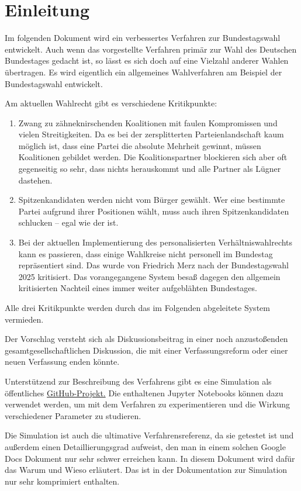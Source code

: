 \section{Einleitung}

Im folgenden Dokument wird ein verbessertes Verfahren zur Bundestagswahl entwickelt. Auch wenn
das vorgestellte Verfahren primär zur Wahl des Deutschen Bundestages gedacht ist, so lässt es
sich doch auf eine Vielzahl anderer Wahlen übertragen. Es wird eigentlich ein allgemeines
Wahlverfahren am Beispiel der Bundestagswahl entwickelt.

Am aktuellen Wahlrecht gibt es verschiedene Kritikpunkte:
\begin{enumerate}
  \item Zwang zu zähneknirschenden Koalitionen mit faulen Kompromissen und vielen Streitigkeiten.
    Da es bei der zersplitterten Parteienlandschaft kaum möglich ist, dass eine Partei die absolute
    Mehrheit gewinnt, müssen Koalitionen gebildet werden. Die Koalitionspartner blockieren sich
    aber oft gegenseitig so sehr, dass nichts herauskommt und alle Partner als Lügner dastehen.

  \item Spitzenkandidaten werden nicht vom Bürger gewählt. Wer eine bestimmte Partei aufgrund
    ihrer Positionen wählt, muss auch ihren Spitzenkandidaten schlucken -- egal wie der ist.

  \item Bei der aktuellen Implementierung des personalisierten Verhältniswahlrechts kann es
    passieren, dass einige Wahlkreise nicht personell im Bundestag repräsentiert sind. Das wurde
    von Friedrich Merz nach der Bundestagswahl 2025 kritisiert. Das vorangegangene System besaß
    dagegen den allgemein kritisierten Nachteil eines immer weiter aufgeblähten Bundestages.
\end{enumerate}

Alle drei Kritikpunkte werden durch das im Folgenden abgeleitete System vermieden.

Der Vorschlag versteht sich als Diskussionsbeitrag in einer noch anzustoßenden
gesamtgesellschaftlichen Diskussion, die mit einer Verfassungsreform oder einer neuen Verfassung
enden könnte.

Unterstützend zur Beschreibung des Verfahrens gibt es eine Simulation als öffentliches
\href{https://github.com/danielschwalbe/ipres}{GitHub-Projekt.} Die enthaltenen Jupyter Notebooks
können dazu verwendet werden, um mit dem Verfahren zu experimentieren und die Wirkung
verschiedener Parameter zu studieren.

Die Simulation ist auch die ultimative Verfahrensreferenz, da sie getestet ist und außerdem
einen Detaillierungsgrad aufweist, den man in einem solchen Google Docs Dokument nur sehr schwer
erreichen kann. In diesem Dokument wird dafür das Warum und Wieso erläutert. Das ist in der
Dokumentation zur Simulation nur sehr komprimiert enthalten.
